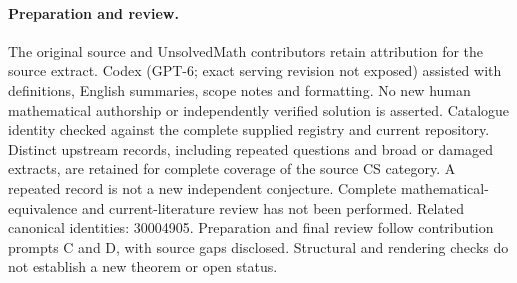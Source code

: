 \documentclass[11pt]{article}
\begin{document}
\paragraph{Preparation and review.}
The original source and UnsolvedMath contributors retain attribution for the source extract. Codex (GPT-6; exact serving revision not exposed) assisted with definitions, English summaries, scope notes and formatting. No new human mathematical authorship or independently verified solution is asserted. Catalogue identity checked against the complete supplied registry and current repository. Distinct upstream records, including repeated questions and broad or damaged extracts, are retained for complete coverage of the source CS category. A repeated record is not a new independent conjecture. Complete mathematical-equivalence and current-literature review has not been performed. Related canonical identities: 30004905. Preparation and final review follow contribution prompts C and D, with source gaps disclosed. Structural and rendering checks do not establish a new theorem or open status.
\label{end:statement}
\end{document}

